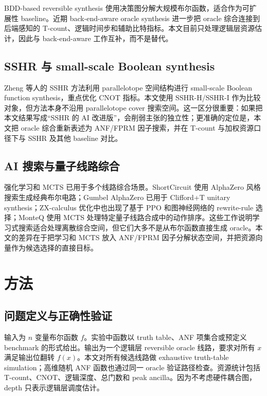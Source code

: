 \documentclass[UTF8,fontset=macnew,11pt]{ctexart}
\begin{document}
BDD-based reversible synthesis 使用决策图分解大规模布尔函数，适合作为可扩展性 baseline\cite{wille2009bdd}。近期 back-end-aware oracle synthesis 进一步把 oracle 综合连接到后端感知的 T-count、逻辑时间步和辅助比特指标\cite{yu2025backend}。本文目前只处理逻辑层资源估计，因此与 back-end-aware 工作互补，而不是替代。

\subsection{SSHR 与 small-scale Boolean synthesis}

Zheng 等人的 SSHR 方法利用 parallelotope 空间结构进行 small-scale Boolean function synthesis，重点优化 CNOT 指标\cite{zheng2025sshr}。本文使用 SSHR-H/SSHR-I 作为比较对象，但方法本身不沿用 parallelotope cover 搜索空间。这一区分很重要：如果把本文结果写成“SSHR 的 AI 改进版”，会削弱主张的独立性；更准确的定位是，本文把 oracle 综合重新表述为 ANF/FPRM 因子搜索，并在 T-count 与加权资源口径下与 SSHR 及其他 baseline 对比。

\subsection{AI 搜索与量子线路综合}

强化学习和 MCTS 已用于多个线路综合场景。ShortCircuit 使用 AlphaZero 风格搜索生成经典布尔电路\cite{tsaras2024shortcircuit}；Gumbel AlphaZero 已用于 Clifford+T unitary synthesis\cite{rietsch2024unitary}；ZX-calculus 优化中也出现了基于 PPO 和图神经网络的 rewrite-rule 选择\cite{riu2025zx}；MonteQ 使用 MCTS 处理特定量子线路合成中的动作排序\cite{machiya2026monteq}。这些工作说明学习式搜索适合处理离散综合空间，但它们大多不是从布尔函数直接生成 oracle。本文的差异在于把学习和 MCTS 放入 ANF/FPRM 因子分解状态空间，并把资源向量作为候选选择的直接目标。

\section{方法}

\subsection{问题定义与正确性验证}

输入为 $n$ 变量布尔函数 $f$。实验中函数以 truth table、ANF 项集合或预定义 benchmark 的形式给出。输出为一个逻辑层 reversible oracle 线路，要求对所有 $x$ 满足输出位翻转 $f(x)$。本文对所有候选线路做 exhaustive truth-table simulation；高维随机 ANF 函数也通过同一 oracle 验证路径检查。资源统计包括 T-count、CNOT、逻辑深度、总门数和 peak ancilla。因为不考虑硬件耦合图，depth 只表示逻辑层调度估计。
\end{document}
